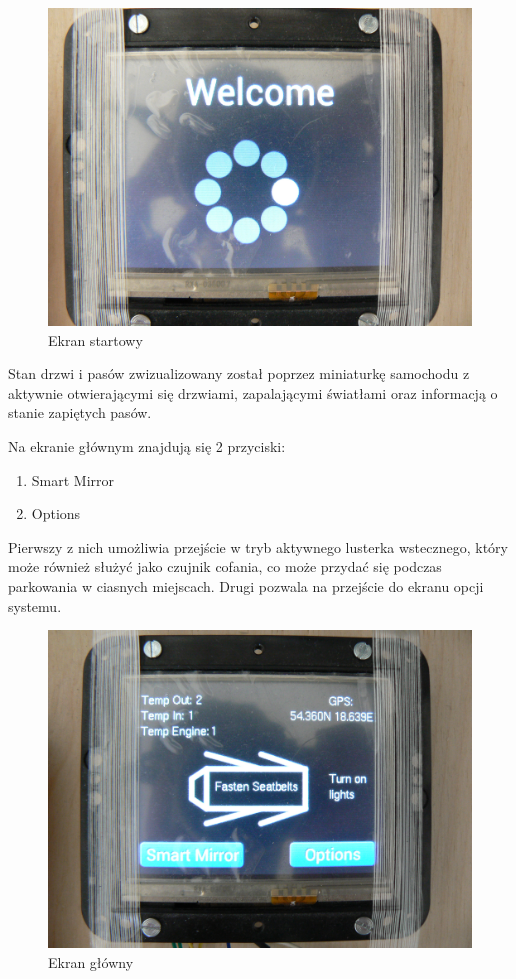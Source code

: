 \documentclass{xmgr}
\begin{document}
\begin{figure}[!h]
    \centering
    	\includegraphics[height=0.4\textheight]{images/start.JPG}
    \caption{Ekran startowy}
\end{figure} 

Stan drzwi i pasów zwizualizowany został poprzez miniaturkę samochodu z aktywnie otwierającymi się drzwiami, zapalającymi światłami oraz informacją o stanie zapiętych pasów.

Na ekranie głównym znajdują się 2 przyciski:
\begin{enumerate}
	\item Smart Mirror
	\item Options
\end{enumerate}

Pierwszy z nich umożliwia przejście w tryb aktywnego lusterka wstecznego, który może również służyć jako czujnik cofania, co może przydać się podczas parkowania w ciasnych miejscach. Drugi pozwala na przejście do ekranu opcji systemu. 

\begin{figure}[!h]
    \centering
    	\includegraphics[height=0.4\textheight]{images/mainScreen.JPG}
    \caption{Ekran główny}
\end{figure}
\end{document}
